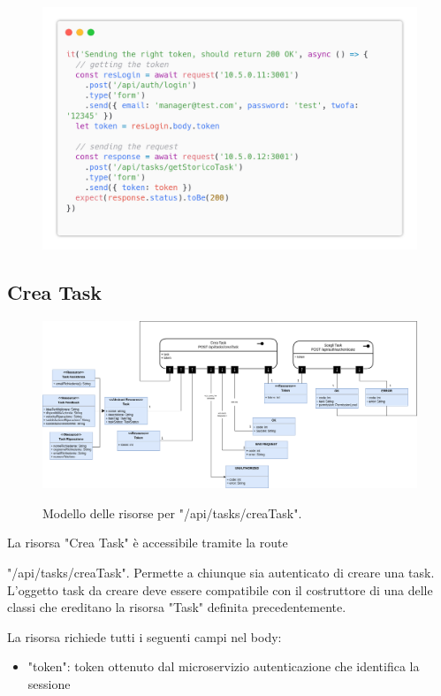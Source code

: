 \documentclass{report}
\begin{document}
\begin{figure}[H]
	\centering\includegraphics[width=1\textwidth]{images/code_storico_test4.png}
\end{figure}


\subsection*{Crea Task}

\begin{figure}[H]
	\centering\includegraphics[width=1\textwidth]{images/model_crea_task.png}
	
	Modello delle risorse per "/api/tasks/creaTask".
\end{figure}

La risorsa "Crea Task" è accessibile tramite la route

"/api/tasks/creaTask". Permette a chiunque sia autenticato di creare una task. L'oggetto task da creare deve essere compatibile con il costruttore di una delle classi che ereditano la risorsa "Task" definita precedentemente.

La risorsa richiede tutti i seguenti campi nel body:
\begin{itemize}
	\item "token": token ottenuto dal microservizio autenticazione che identifica la sessione
\end{itemize}
\end{document}

